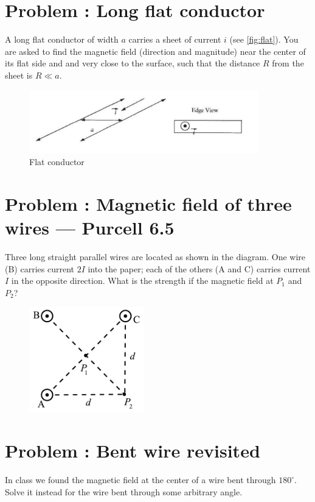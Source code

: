 \documentclass[problems]{esg8022pset}
\date{\today }
\begin{document}
\section{Problem \thesection: Long flat conductor}
  A long flat conductor of width $a$ carries a sheet of current $i$ (see
  \autoref{fig:flat}). You are asked to find the magnetic field (direction and
  magnitude) near the center of its flat side and and very close to the
  surface, such that the distance $R$ from the sheet is $R \ll a$.

  \begin{figure}[ht]
    \centering
    \includegraphics[width = 10cm]{flat_conductor}
    \caption{Flat conductor}
    \label{fig:flat}
  \end{figure}

\section{Problem \thesection: Magnetic field of three wires --- Purcell 6.5}
Three long straight parallel wires are located as shown in the diagram. One wire (B) carries current $2 I$ into the paper;
 each of the others (A and C) carries current $I$ in the opposite direction. What is the strength if the magnetic field at $P_1$
  and $P_{2}$?

   \begin{figure}[ht]
    \centering
    \includegraphics[width = 5cm]{Threewires}
    \label{fig:threewire}
  \end{figure}

\section{Problem \thesection: Bent wire revisited}
In class we found the magnetic field at the center of a wire bent through $180^\circ$.
Solve it instead for the wire bent through some arbitrary angle.
\end{document}

